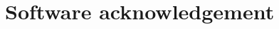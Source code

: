 \documentclass[10pt, twocolumn]{article}
\begin{document}
\printbibliography

\appendix

\section{Software acknowledgement}
\label{appendix:software}


\end{document}
